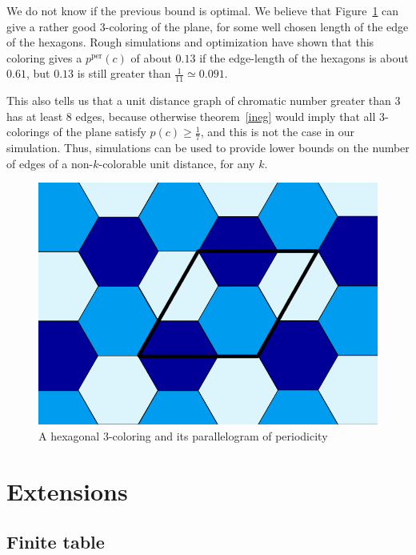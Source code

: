 \documentclass[a4paper,11pt]{article}
\theoremstyle{definition}
\theoremstyle{remark}
\newcommand{\pper}{p^{\mathrm{per}}}
\begin{document}
We do not know if the previous bound is optimal. We believe that Figure~\ref{trois} 
can give a rather good $3$-coloring of the plane, for some well chosen length 
of the edge of the hexagons. Rough simulations and optimization have shown that 
this coloring gives a $\pper(c)$ of about $0.13$ if the edge-length of the hexagons is about 
$0.61$, but $0.13$ is still greater than $\frac{1}{11} \simeq 0.091$.

This also tells us that a unit distance graph of chromatic number greater than 3
has at least $8$ edges, because otherwise theorem~\ref{ineg} would imply that
all $3$-colorings of the plane satisfy $p(c) \geq \frac17$, and this is not the
case in our simulation. Thus, simulations can be used to provide lower bounds on the
number of edges of a non-$k$-colorable unit distance, for any $k$.

\begin{figure}[h]
\center
\includegraphics[scale=0.5]{trois.png}
\caption{\label{trois} A hexagonal $3$-coloring and its parallelogram of periodicity}
\end{figure}

\section{Extensions}
\label{ext}
\subsection{Finite table}
\label{fini}
\end{document}
